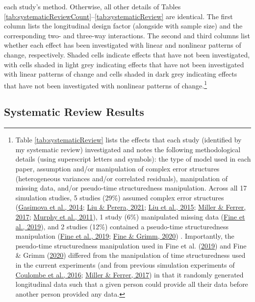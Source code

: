 \documentclass[
12pt, %
twoside,
english]{guelphthesis}
\begin{document}
\noindent each study's method. Otherwise, all other details of Tables \ref{tab:systematicReviewCount}--\ref{tab:systematicReview} are identical. The first column lists the longitudinal design factor (alongside with sample size) and the corresponding two- and three-way interactions. The second and third columns list whether each effect has been investigated with linear and nonlinear patterns of change, respectively. Shaded cells indicate effects that have not been investigated, with cells shaded in light grey indicating effects that have not been investigated with linear patterns of change and cells shaded in dark grey indicating effects that have not been investigated with nonlinear patterns of change.\footnote{Table \ref{tab:systematicReview} lists the effects that each study (identified by my systematic review) investigated and notes the following methodological details (using superscript letters and symbols): the type
of model used in each paper, assumption and/or manipulation of complex error structures
(heterogeneous variances and/or correlated residuals), manipulation of missing data,
and/or pseudo-time structuredness manipulation. Across all 17 simulation studies, 5 studies (29\%) assumed complex error structures (\protect\hyperlink{ref-gasimova2014}{Gasimova et al., 2014}; \protect\hyperlink{ref-liu2021}{Liu \& Perera, 2021}; \protect\hyperlink{ref-liu2015}{Liu et al., 2015}; \protect\hyperlink{ref-miller2017}{Miller \& Ferrer, 2017}; \protect\hyperlink{ref-murphy2011}{Murphy et al., 2011}), 1 study (6\%) manipulated missing data (\protect\hyperlink{ref-fine2019}{Fine et al., 2019}), and 2 studies (12\%) contained a pseudo-time structuredness manipulation (\protect\hyperlink{ref-fine2019}{Fine et al., 2019}; \protect\hyperlink{ref-fine2020}{Fine \& Grimm, 2020}) . Importantly, the pseudo-time structuredness manipulation used in Fine et al. (\protect\hyperlink{ref-fine2019}{2019}) and Fine \& Grimm (\protect\hyperlink{ref-fine2020}{2020}) differed from the manipulation of time structuredness used in the current experiments (and from previous simulation experiments of \protect\hyperlink{ref-coulombe2016}{Coulombe et al., 2016}; \protect\hyperlink{ref-miller2017}{Miller \& Ferrer, 2017}) in that it randomly generated longitudinal data such that a given person could provide all their data before another person provided any data.}

\hypertarget{systematic-review-results}{%
\subsection{Systematic Review Results}\label{systematic-review-results}}
\end{document}
